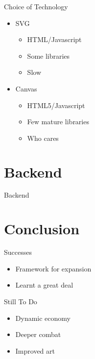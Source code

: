 \begin{frame}{Choice of Technology}
  \begin{itemize}
    \item SVG
      \begin{itemize}
        \item HTML/Javascript
        \item Some libraries
        \item Slow
      \end{itemize}
    \item Canvas
      \begin{itemize}
        \item HTML5/Javascript
        \item Few mature libraries
        \item Who cares
      \end{itemize}
  \end{itemize}
\end{frame}

\section{Backend}
\begin{frame}{Backend}
\end{frame}

\section{Conclusion}
\begin{frame}{Successes}
  \begin{itemize}
    \item Framework for expansion
    \item Learnt a great deal
  \end{itemize}
\end{frame}

\begin{frame}{Still To Do}
  \begin{itemize}
    \item Dynamic economy
    \item Deeper combat
    \item Improved art
  \end{itemize}
\end{frame}



